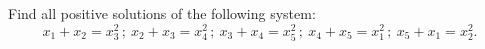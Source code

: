 Find all positive solutions of the following system:
\[
x_1 + x_2 = x_3^2\,;\ x_2 + x_3 = x_4^2\,;\ x_3 + x_4 = x_5^2\,;\ x_4 + x_5 = x_1^2\,;\ x_5 + x_1 = x_2^2.
\]
